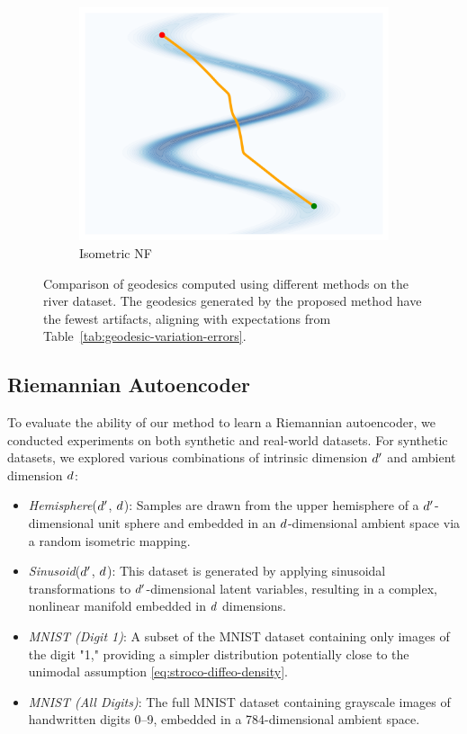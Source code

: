 \begin{figure}[htbp]
\begin{subfigure}[b]{0.18\textwidth}
        \includegraphics[width=\textwidth]{chapter5/results/visualisations/geodesics/isometricNF.png}
        \caption{\scriptsize Isometric NF}
        \end{subfigure}
        \caption{Comparison of geodesics computed using different methods on the river dataset. The geodesics generated by the proposed method have the fewest artifacts, aligning with expectations from Table~\ref{tab:geodesic-variation-errors}.}
        \label{fig:geodesics_comparison}
    \end{figure}
    

\subsection{Riemannian Autoencoder}\label{sec:RAE-experiments}
    
    To evaluate the ability of our method to learn a Riemannian autoencoder, we conducted experiments on both synthetic and real-world datasets. For synthetic datasets, we explored various combinations of intrinsic dimension $d'$ and ambient dimension $d$:

    \begin{itemize}
    \item \textit{Hemisphere}($d'$, $d$): Samples are drawn from the upper hemisphere of a $d'$-dimensional unit sphere and embedded in an $d$-dimensional ambient space via a random isometric mapping.
    \item \textit{Sinusoid}($d'$, $d$): This dataset is generated by applying sinusoidal transformations to $d'$-dimensional latent variables, resulting in a complex, nonlinear manifold embedded in $d$ dimensions.
    \item \textit{MNIST (Digit 1)}: A subset of the MNIST dataset containing only images of the digit "1," providing a simpler distribution potentially close to the unimodal assumption \ref{eq:stroco-diffeo-density}.
    \item \textit{MNIST (All Digits)}: The full MNIST dataset containing grayscale images of handwritten digits 0--9, embedded in a 784-dimensional ambient space.
    
    \end{itemize}
    
